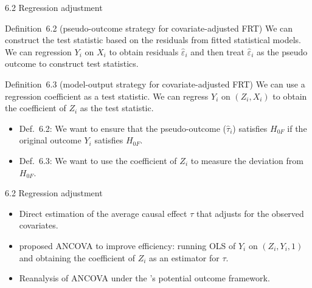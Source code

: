 \documentclass[aspectratio=169, 12pt]{beamer}
\begin{document}
\begin{frame}{6.2 Regression adjustment}
  \begin{keybox}{Definition~6.2 (pseudo-outcome strategy for covariate-adjusted FRT)}
    We can construct the test statistic based on the residuals from fitted statistical models. We can regression $Y_i$ on $X_i$ to obtain residuals $\widehat{\varepsilon}_i$ and then treat $\widehat{\varepsilon}_i$ as the pseudo outcome to construct test statistics.
  \end{keybox}
  \begin{keybox}{Definition~6.3 (model-output strategy for covariate-adjusted FRT)}
    We can use a regression coefficient as a test statistic. We can regress $Y_i$ on $(Z_i, X_i)$ to obtain the coefficient of $Z_i$ as the test statistic.
  \end{keybox}
  \begin{itemize}
    \item Def.~6.2: We want to ensure that the pseudo-outcome ($\widehat{\tau}_i$) satisfies $H_{0F}$ if the original outcome $Y_i$ satisfies $H_{0F}$.
    \item Def.~6.3: We want to use the coefficient of $Z_i$ to measure the deviation from $H_{0F}$.
  \end{itemize}
\end{frame}

\begin{frame}{6.2 Regression adjustment}
  \begin{itemize}
    \item Direct estimation of the average causal effect $\tau$ that adjusts for the observed covariates.
    \item \citet{fisher1934statistical} proposed ANCOVA to improve efficiency: running OLS of $Y_i$ on $(Z_i,Y_i,1)$ and obtaining the coefficient of $Z_i$ as an estimator for $\tau$.
    \item Reanalysis of ANCOVA under the \citet{neyman1923application}'s potential outcome framework.
  \end{itemize}
\end{frame}
\end{document}
